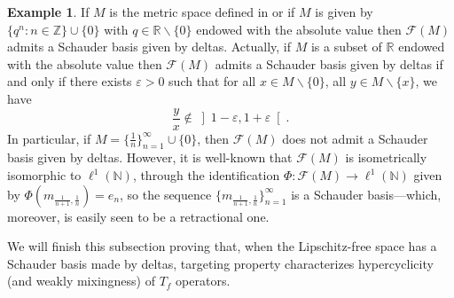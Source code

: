 \documentclass[12pt,english]{amsart}
\numberwithin{equation}{section}
\theoremstyle{plain}
\theoremstyle{definition}
\newtheorem{example}[theorem]{Example}
\def\NN{\mathbb N}
\newcommand{\free}[1]{\mathcal{F}(#1)}
\begin{document}
\begin{example}\label{deltaexamp}
If $M$ is the metric space defined in \cite[Proposition 1.6]{ACP21} or if $M$ is given by $\{q^n:n\in \mathbb{Z}\}\cup \{0\}$ with $q\in \mathbb{R}\backslash\{0\}$ endowed with 
the absolute value then $\mathcal{F}(M)$ admits a Schauder basis given by 
deltas. Actually, if $M$ is a subset of $\mathbb{R}$ endowed with the absolute value then $\free{M}$ admits a 
Schauder basis given by deltas if and only if there exists $\varepsilon>0$ such that for all $x\in M\backslash\{0\}$, all $y\in M\backslash\{x\}$, we have
\[\frac{y}{x}\notin \left]1-\varepsilon,1+\varepsilon\right[.\]
 In particular, if $M=\{\frac{1}{n}\}_{n=1}^\infty \cup\{0\}$, then 
$\mathcal{F}(M)$ does not admit a Schauder basis given by deltas. However, it is well-known that $\free{M}$ is isometrically isomorphic to $\ell^1(\NN)$, through the identification $\Phi\colon \free{M}\to \ell^1(\NN)$ given by $\Phi(m_{\frac{1}{n+1},\frac{1}{n}})=e_n$, so the sequence $\{m_{\frac{1}{n+1},\frac{1}{n}}\}_{n=1}^\infty$ is a Schauder basis---which, moreover, is easily seen to be a retractional one.
\end{example}

We will finish this subsection proving that, when the Lipschitz-free space has a Schauder basis made by deltas, targeting property characterizes hypercyclicity (and weakly mixingness) of $T_f$ operators.
\end{document}
